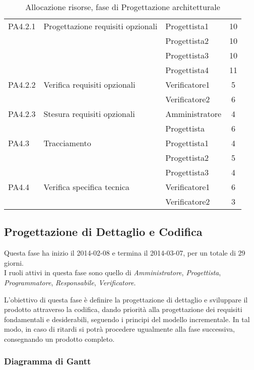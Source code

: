\begin{table}[H]
\begin{tabular}{ l l l c  }
	\cline{3-4}
	PA4.2.1 & Progettazione requisiti opzionali & Progettista1 & 10\\ 
	& & Progettista2 & 10\\
	& & Progettista3 & 10\\
	& & Progettista4 & 11\\
    \cline{3-4}
	PA4.2.2 & Verifica requisiti opzionali & Verificatore1 &  5\\
	& & Verificatore2 & 6\\
	\cline{3-4}
	PA4.2.3 & Stesura requisiti opzionali & Amministratore &  4\\
	& & Progettista & 6\\
	\cline{3-4}
	PA4.3 & Tracciamento & Progettista1 &  4\\
	& & Progettista2 & 5\\
	& & Progettista3 & 4\\
	\cline{3-4}
	PA4.4 & Verifica specifica tecnica & Verificatore1 &  6\\
	& & Verificatore2 & 3\\
	
	\hline
	\end{tabular}
	\caption{Allocazione risorse, fase di Progettazione architetturale}
	\end{table}
	
	\subsection{Progettazione di Dettaglio e Codifica}
	 
Questa fase ha inizio il 2014-02-08 e termina il 2014-03-07, per un totale di 29  giorni. \\
I ruoli attivi in questa fase sono quello di \textit{Amministratore}, \textit{Progettista}, \textit{Programmatore}, \textit{Responsabile}, \textit{Verificatore}.

L'obiettivo di questa fase è definire la progettazione di dettaglio e sviluppare il prodotto attraverso la codifica, dando priorità alla progettazione dei requisiti fondamentali e desiderabili, seguendo i principi del modello incrementale.
In tal modo, in caso di ritardi si potrà procedere ugualmente alla fase successiva, consegnando un prodotto completo.

\subsubsection{Diagramma di Gantt}


